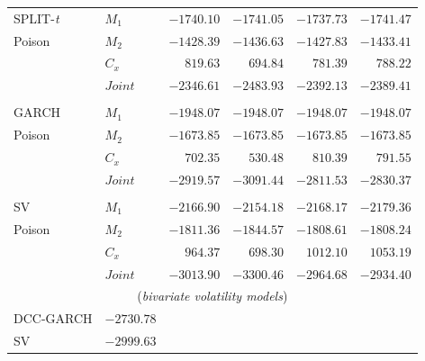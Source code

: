 \documentclass[a0paper,portrait,fontscale = 0.39,margin=2.5em]{baposter/baposter}
\begin{document}
\begin{poster}
{\begin{multicols}{2}
\begin{compactitem}
{\begin{tabular}{llrrrr}
            SPLIT-\emph{t} &  $M_1$  &    $-1740.10$      &   $-1741.05$       &   $-1737.73$      &     $-1741.47$              \\
            Poison         &  $M_2$  &     $-1428.39$    &     $-1436.63$     &    $-1427.83$     &      $-1433.41$               \\
                                                       &  $C_x$   &     $819.63$       &   $694.84$       &  $781.39$       &       $788.22$              \\
                                                       &  $Joint$   &    $\mathbf{-2346.61}$       &    $-2483.93$     &   $-2392.13$     &   $-2389.41$                \\

            \\
            GARCH          &  $M_1$   &     $-1948.07$       &  $-1948.07$        &  $-1948.07$    &     $-1948.07$                \\
            Poison            &  $M_2$   &     $-1673.85$       &  $-1673.85$        &  $-1673.85$     &    $-1673.85$                 \\
                                                       &  $C_x$   &     $702.35$       &    $530.48$      &   $810.39$      &        $791.55$               \\
                                                       &  $Joint$   &     $-2919.57$       &   $$-3091.44$$       &  $-2811.53$   &     $-2830.37$                \\
            \\
            SV             &  $M_1$   &     $-2166.90$       &  $-2154.18$        &   $-2168.17$      &         $-2179.36$            \\
            Poison               &  $M_2$   &     $-1811.36$       &   $-1844.57$       &  $-1808.61$      &     $-1808.24$              \\
                                                       &  $C_x$   &     $964.37$      &   $698.30$     &   $1012.10$      &      $1053.19$               \\
                                                       &  $Joint$   &     $-3013.90$       &     $-3300.46$     &  $-2964.68$  &    $-2934.40$               \\
            \midrule
            \multicolumn{6}{c}{(\emph{bivariate volatility models})}\\
            DCC-GARCH &  $-2730.78$ & \\
            SV &  $-2999.63$ & \\


\end{tabular}}
\end{compactitem}
\end{multicols}}
\end{poster}
\end{document}
